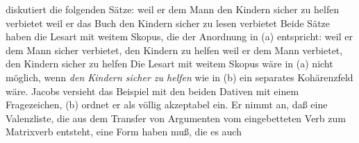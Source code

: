 \citet[]{Jacobs91a} diskutiert die folgenden Sätze:
\eal
\ex{}
weil    er       dem Mann      den Kindern        sicher zu helfen verbietet
\ex
weil    er       das Buch      den Kindern        sicher zu lesen verbietet
\zl
Beide Sätze haben die Lesart mit weitem Skopus, die der Anordnung in (a) entspricht:
\eal
\ex weil er dem Mann sicher verbietet, den Kindern zu helfen
\ex weil er dem Mann verbietet, den Kindern sicher zu helfen
\zl
Die Lesart mit weitem Skopus wäre in (a) nicht möglich, wenn \emph{den Kindern sicher zu
  helfen} wie in (b) ein separates Kohärenzfeld wäre. Jacobs versieht das Beispiel mit den beiden Dativen
mit einem Fragezeichen, (b) ordnet er als völlig akzeptabel ein.
Er nimmt an, daß eine Valenzliste, die aus dem Transfer von Argumenten vom
eingebetteten Verb zum Matrixverb entsteht, eine Form haben muß, die es auch\enlargethispage{\baselineskip}
